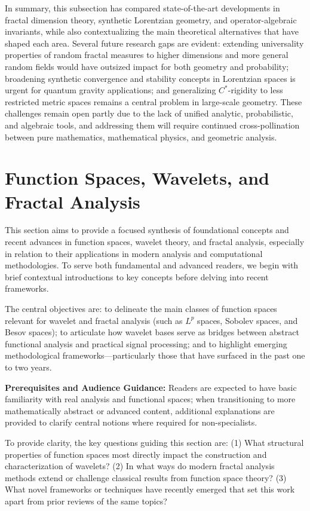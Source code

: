 \documentclass[sigconf]{acmart}
\begin{document}
In summary, this subsection has compared state-of-the-art developments in fractal dimension theory, synthetic Lorentzian geometry, and operator-algebraic invariants, while also contextualizing the main theoretical alternatives that have shaped each area. Several future research gaps are evident: extending universality properties of random fractal measures to higher dimensions and more general random fields would have outsized impact for both geometry and probability; broadening synthetic convergence and stability concepts in Lorentzian spaces is urgent for quantum gravity applications; and generalizing $C^*$-rigidity to less restricted metric spaces remains a central problem in large-scale geometry. These challenges remain open partly due to the lack of unified analytic, probabilistic, and algebraic tools, and addressing them will require continued cross-pollination between pure mathematics, mathematical physics, and geometric analysis.

\section{Function Spaces, Wavelets, and Fractal Analysis}

This section aims to provide a focused synthesis of foundational concepts and recent advances in function spaces, wavelet theory, and fractal analysis, especially in relation to their applications in modern analysis and computational methodologies. To serve both fundamental and advanced readers, we begin with brief contextual introductions to key concepts before delving into recent frameworks.  

The central objectives are: to delineate the main classes of function spaces relevant for wavelet and fractal analysis (such as $L^p$ spaces, Sobolev spaces, and Besov spaces); to articulate how wavelet bases serve as bridges between abstract functional analysis and practical signal processing; and to highlight emerging methodological frameworks—particularly those that have surfaced in the past one to two years.

\textbf{Prerequisites and Audience Guidance:} Readers are expected to have basic familiarity with real analysis and functional spaces; when transitioning to more mathematically abstract or advanced content, additional explanations are provided to clarify central notions where required for non-specialists.

To provide clarity, the key questions guiding this section are: (1) What structural properties of function spaces most directly impact the construction and characterization of wavelets? (2) In what ways do modern fractal analysis methods extend or challenge classical results from function space theory? (3) What novel frameworks or techniques have recently emerged that set this work apart from prior reviews of the same topics?
\end{document}
